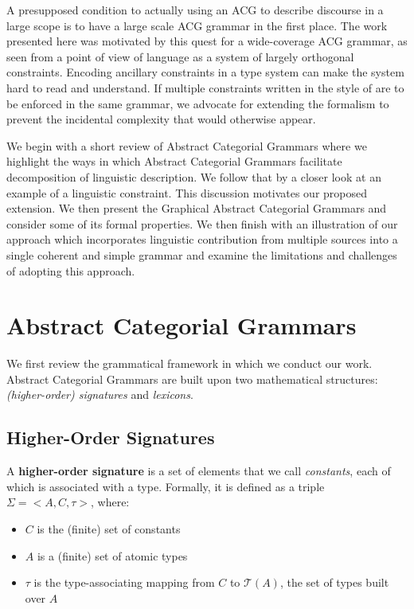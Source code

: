 \documentclass{llncs}
\begin{document}
A presupposed condition to actually using an ACG to describe discourse in a
large scope is to have a large scale ACG grammar in the first place. The work
presented here was motivated by this quest for a wide-coverage ACG grammar, as
seen from a point of view of language as a system of largely orthogonal
constraints. Encoding ancillary constraints in a type system can make the
system hard to read and understand. If multiple constraints written in the
style of \cite{pogodalla2012controlling} are to be enforced in the same
grammar, we advocate for extending the formalism to prevent the incidental
complexity that would otherwise appear.

We begin with a short review of Abstract Categorial Grammars where we
highlight the ways in which Abstract Categorial Grammars facilitate
decomposition of linguistic description. We follow that by a closer look at an
example of a linguistic constraint. This discussion motivates our proposed
extension. We then present the Graphical Abstract Categorial Grammars and
consider some of its formal properties. We then finish with an illustration of
our approach which incorporates linguistic contribution from multiple sources
into a single coherent and simple grammar and examine the limitations and
challenges of adopting this approach.


\section{Abstract Categorial Grammars}
\label{sec:acg-comp}

We first review the grammatical framework in which we conduct our
work. Abstract Categorial Grammars are built upon two mathematical structures:
\emph{(higher-order) signatures} and \emph{lexicons}.

\subsection{Higher-Order Signatures}
\label{ssec:sig}

A \textbf{higher-order signature} is a set of elements that we call
\emph{constants}, each of which is associated with a type. Formally, it
is defined as a triple $\Sigma = \mathopen{<}A, C, \tau\mathclose{>}$,
where:
\begin{itemize}
  \item $C$ is the (finite) set of constants
  \item $A$ is a (finite) set of atomic types
  \item $\tau$ is the type-associating mapping from $C$ to
    $\mathcal{T}(A)$, the set of types built over $A$
\end{itemize}
\end{document}
